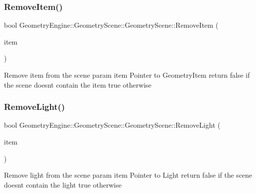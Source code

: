 \subsubsection{\texorpdfstring{RemoveItem()}{RemoveItem()}}
{\footnotesize\ttfamily bool Geometry\+Engine\+::\+Geometry\+Scene\+::\+Geometry\+Scene\+::\+Remove\+Item (\begin{DoxyParamCaption}\item[{\mbox{\hyperlink{class_geometry_engine_1_1_geometry_world_item_1_1_geometry_item_1_1_geometry_item}{Geometry\+World\+Item\+::\+Geometry\+Item\+::\+Geometry\+Item}} $\ast$}]{item }\end{DoxyParamCaption})\hspace{0.3cm}{\ttfamily [virtual]}}

Remove item from the scene param item Pointer to Geometry\+Item return false if the scene doesn\textquotesingle{}t contain the item true otherwise \mbox{\label{class_geometry_engine_1_1_geometry_scene_1_1_geometry_scene_ab0217afe0c403087d3be028f012b1125}} 
\subsubsection{\texorpdfstring{RemoveLight()}{RemoveLight()}}
{\footnotesize\ttfamily bool Geometry\+Engine\+::\+Geometry\+Scene\+::\+Geometry\+Scene\+::\+Remove\+Light (\begin{DoxyParamCaption}\item[{\mbox{\hyperlink{class_geometry_engine_1_1_geometry_world_item_1_1_geometry_light_1_1_light}{Geometry\+World\+Item\+::\+Geometry\+Light\+::\+Light}} $\ast$}]{item }\end{DoxyParamCaption})\hspace{0.3cm}{\ttfamily [virtual]}}

Remove light from the scene param item Pointer to Light return false if the scene doesn\textquotesingle{}t contain the light true otherwise \mbox{\label{class_geometry_engine_1_1_geometry_scene_1_1_geometry_scene_a862a151509389f4f0c15e7ed4e3917c8}} 
